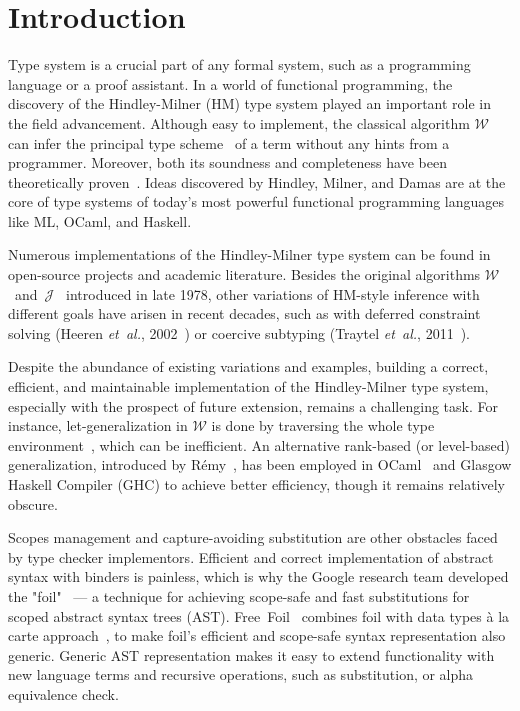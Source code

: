 \chapter{Introduction}
\label{chap:intro}

Type system is a crucial part of any formal system, such as a programming language or a proof assistant. In a world of functional programming, the discovery of the Hindley-Milner (HM) type system played an important role in the field advancement. Although easy to implement, the classical algorithm $\mathcal{W}$~\cite{Milner1978_TypePolymorphism} can infer the principal type scheme~\cite{Hindley1969_PrincipalTypeScheme} of a term without any hints from a programmer. Moreover, both its soundness and completeness have been theoretically proven~\cite{Damas1984_TypeAssignment}. Ideas discovered by Hindley, Milner, and Damas are at the core of type systems of today's most powerful functional programming languages like ML, OCaml, and Haskell.

Numerous implementations of the Hindley-Milner type system can be found in open-source projects and academic literature. Besides the original algorithms $\mathcal{W}$~and~$\mathcal{J}$~\cite{Milner1978_TypePolymorphism} introduced in late 1978, other variations of HM-style inference with different goals have arisen in recent decades, such as with deferred constraint solving (Heeren \textit{et~al.}, 2002~\cite{Heeren2002_GeneralizingHM}) or coercive subtyping (Traytel \textit{et~al.}, 2011~\cite{Traytel2011_HMCoerciveSubtyping}).

Despite the abundance of existing variations and examples, building a correct, efficient, and maintainable implementation of the Hindley-Milner type system, especially with the prospect of future extension, remains a challenging task. For instance, let-generalization in $\mathcal{W}$ is done by traversing the whole type environment~\cite{DamasMilner1982_TypeSchemes}, which can be inefficient. An alternative rank-based (or level-based) generalization, introduced by R\'emy~\cite{Remy1992_SortedEqTheoryTypes}, has been employed in OCaml~\cite{Kiselyov2022_OCamplTypeChecker} and Glasgow Haskell Compiler (GHC) to achieve better efficiency, though it remains relatively obscure.

Scopes management and capture-avoiding substitution are other obstacles faced by type checker implementors. Efficient and correct implementation of abstract syntax with binders is painless, which is why the Google research team developed the "foil"~\cite{Foil} — a technique for achieving scope-safe and fast substitutions for scoped abstract syntax trees (AST). Free~Foil~\cite{FreeFoil} combines foil with data types à la carte approach~\cite{Swierstra2008_a_la_carte}, to make foil's efficient and scope-safe syntax representation also generic. Generic AST representation makes it easy to extend functionality with new language terms and recursive operations, such as substitution, or alpha equivalence check.

